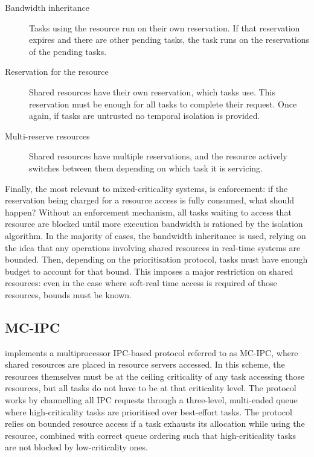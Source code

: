 \begin{description}
\item[Bandwidth inheritance] Tasks using the resource run on their own reservation.  If that
    reservation expires and there are other pending tasks, the task runs on the reservations of the
    pending tasks. 
\item[Reservation for the resource] Shared resources have their own reservation, which tasks use.
    This reservation must be enough for all tasks to complete their request.  Once again, if tasks
    are untrusted no temporal isolation is provided. 
\item[Multi-reserve resources] Shared resources have multiple reservations, and the resource
    actively switches between them depending on which task it is servicing. 
\end{description} 

Finally, the most relevant to mixed-criticality systems, is enforcement: if the reservation being
charged for a resource access is fully consumed, what should happen? Without an enforcement
mechanism, all tasks waiting to access that resource are blocked until more execution bandwidth is
rationed by the isolation algorithm. In the majority of cases, the bandwidth inheritance is used,
relying on the idea that any operations involving shared resources in real-time systems are bounded.
Then, depending on the prioritisation protocol, tasks must have enough budget to account for that
bound. This imposes a major restriction on shared resources: even in the case where soft-real time
access is required of those resources, bounds must be known.

\subsection{MC-IPC}
\label{sec:sched-mc-ipc}

\citet{Brandenburg_14} implements a multiprocessor \gls{IPC}-based protocol referred to as MC-IPC,
where shared resources are placed in resource servers accessed. In this scheme, the resources
themselves must be at the ceiling criticality of any task accessing those resources,
but all tasks do not have to be at that criticality level.
The protocol works by channelling all IPC requests through a three-level, multi-ended queue
where high-criticality tasks are prioritised over best-effort tasks. The protocol relies on bounded
resource access if a task exhausts its allocation while using the resource, combined with correct
queue ordering such that high-criticality tasks are not blocked by low-criticality ones. 

